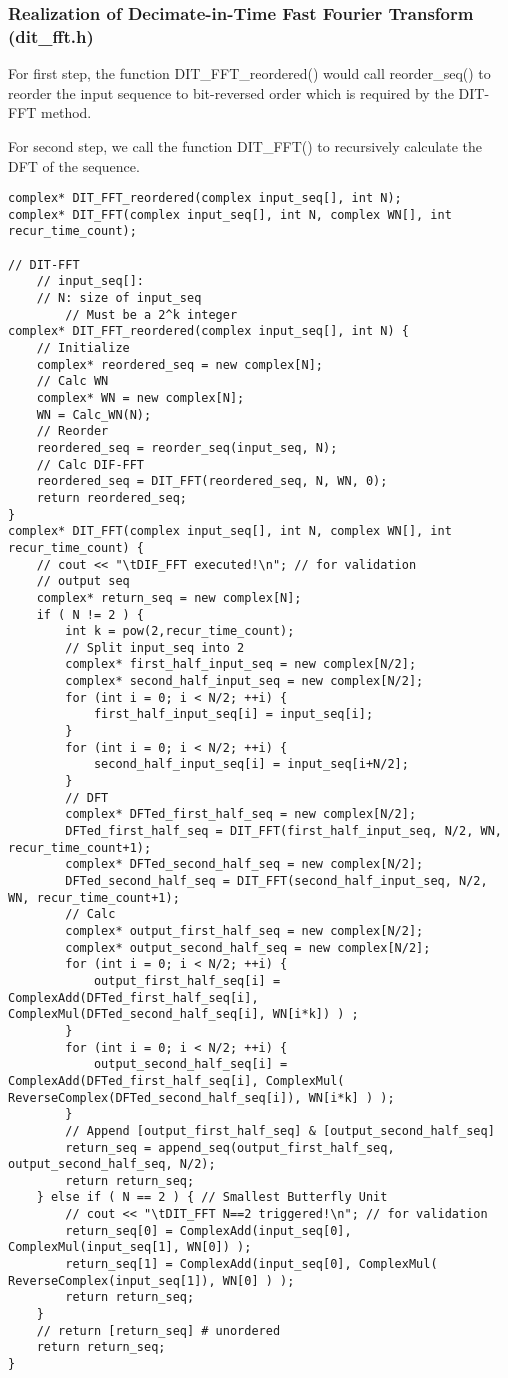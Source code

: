 \documentclass[UTF8,a4paper]{ctexart}
\begin{document}
\newpage
\subsubsection{Realization of Decimate-in-Time Fast Fourier Transform (dit\_fft.h)}


	For first step, the function DIT\_FFT\_reordered() would call reorder\_seq() to reorder the input sequence to bit-reversed order which is required by the DIT-FFT method.
	
	For second step, we call the function DIT\_FFT() to recursively calculate the DFT of the sequence.

    \begin{lstlisting}
complex* DIT_FFT_reordered(complex input_seq[], int N);
complex* DIT_FFT(complex input_seq[], int N, complex WN[], int recur_time_count);

// DIT-FFT
	// input_seq[]: 
	// N: size of input_seq
		// Must be a 2^k integer
complex* DIT_FFT_reordered(complex input_seq[], int N) {
	// Initialize
	complex* reordered_seq = new complex[N];
	// Calc WN
	complex* WN = new complex[N];
	WN = Calc_WN(N);
	// Reorder
	reordered_seq = reorder_seq(input_seq, N);
	// Calc DIF-FFT
	reordered_seq = DIT_FFT(reordered_seq, N, WN, 0);
	return reordered_seq;
}
complex* DIT_FFT(complex input_seq[], int N, complex WN[], int recur_time_count) {
	// cout << "\tDIF_FFT executed!\n"; // for validation
	// output seq
	complex* return_seq = new complex[N];
	if ( N != 2 ) {
		int k = pow(2,recur_time_count);
		// Split input_seq into 2
		complex* first_half_input_seq = new complex[N/2];
		complex* second_half_input_seq = new complex[N/2];
		for (int i = 0; i < N/2; ++i) {
			first_half_input_seq[i] = input_seq[i];
		}
		for (int i = 0; i < N/2; ++i) {
			second_half_input_seq[i] = input_seq[i+N/2];
		}
		// DFT
		complex* DFTed_first_half_seq = new complex[N/2];
		DFTed_first_half_seq = DIT_FFT(first_half_input_seq, N/2, WN, recur_time_count+1);
		complex* DFTed_second_half_seq = new complex[N/2];
		DFTed_second_half_seq = DIT_FFT(second_half_input_seq, N/2, WN, recur_time_count+1);
		// Calc
		complex* output_first_half_seq = new complex[N/2];
		complex* output_second_half_seq = new complex[N/2];
		for (int i = 0; i < N/2; ++i) {
			output_first_half_seq[i] = ComplexAdd(DFTed_first_half_seq[i], ComplexMul(DFTed_second_half_seq[i], WN[i*k]) ) ;
		}
		for (int i = 0; i < N/2; ++i) {
			output_second_half_seq[i] = ComplexAdd(DFTed_first_half_seq[i], ComplexMul( ReverseComplex(DFTed_second_half_seq[i]), WN[i*k] ) );
		}
		// Append [output_first_half_seq] & [output_second_half_seq]
		return_seq = append_seq(output_first_half_seq, output_second_half_seq, N/2);
		return return_seq;
	} else if ( N == 2 ) { // Smallest Butterfly Unit
		// cout << "\tDIT_FFT N==2 triggered!\n"; // for validation
		return_seq[0] = ComplexAdd(input_seq[0], ComplexMul(input_seq[1], WN[0]) );
		return_seq[1] = ComplexAdd(input_seq[0], ComplexMul( ReverseComplex(input_seq[1]), WN[0] ) );
		return return_seq;
	}
	// return [return_seq] # unordered
	return return_seq;
}

    \end{lstlisting}
\end{document}
